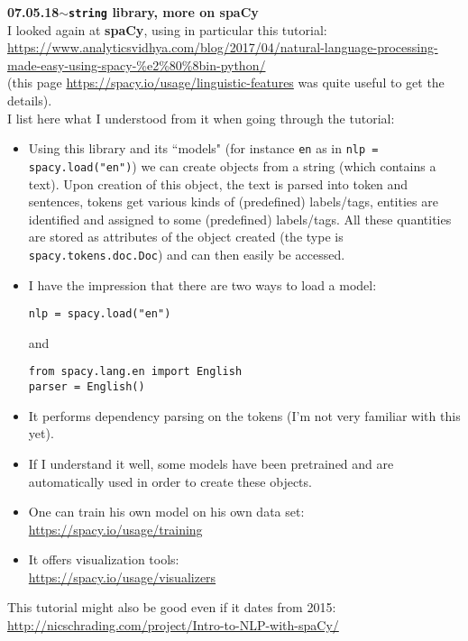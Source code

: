 \documentclass[11pt,a4paper]{article}
\newenvironment{loggentry}[2]%
{\noindent\textbf{#1}\hspace{1cm}$\mathbf{\sim}$\text{ }\textbf{#2}\\}{\vspace{0.5cm}}
\begin{document}
\begin{loggentry}{07.05.18}{\texttt{string} library, more on spaCy}
I looked again at \textbf{spaCy}, using in particular this tutorial:\\
\url{https://www.analyticsvidhya.com/blog/2017/04/natural-language-processing-made-easy-using-spacy-%e2%80%8bin-python/}\\
(this page
\url{https://spacy.io/usage/linguistic-features}
was quite useful to get the details).\\ 
I list here what I understood from it when going through the tutorial:
\begin{itemize}
\item Using this library and its ``models" (for instance \texttt{en} as in \texttt{nlp = spacy.load("en")}) we can create objects from a string (which contains a text). Upon creation of this object, the text is parsed into token and sentences, tokens get various kinds of (predefined) labels/tags, entities are identified and assigned to some (predefined) labels/tags. All these quantities are stored as attributes of the object created (the type is \texttt{spacy.tokens.doc.Doc}) and can then easily be accessed.
\item I have the impression that there are two ways to load a model:
\begin{verbatim}
nlp = spacy.load("en")
\end{verbatim}
and
\begin{verbatim}
from spacy.lang.en import English
parser = English()
\end{verbatim}
\item It performs dependency parsing on the tokens (I'm not very familiar with this yet).
\item If I understand it well, some models have been pretrained and are automatically used in order to create these objects.
\item One can train his own model on his own data set:\\
\url{https://spacy.io/usage/training}\\
\item It offers visualization tools:\\
\url{https://spacy.io/usage/visualizers}\\
\end{itemize}
This tutorial might also be good even if it dates from 2015:\\
\url{http://nicschrading.com/project/Intro-to-NLP-with-spaCy/}\\
\end{loggentry}
\end{document}
